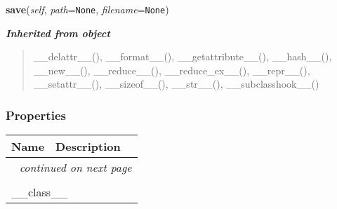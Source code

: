 \hspace{.8\funcindent}\begin{boxedminipage}{\funcwidth}

    \raggedright \textbf{save}(\textit{self}, \textit{path}={\tt None}, \textit{filename}={\tt None})

\setlength{\parskip}{2ex}
\setlength{\parskip}{1ex}
    \end{boxedminipage}


\large{\textbf{\textit{Inherited from object}}}

\begin{quote}
\_\_delattr\_\_(), \_\_format\_\_(), \_\_getattribute\_\_(), \_\_hash\_\_(), \_\_new\_\_(), \_\_reduce\_\_(), \_\_reduce\_ex\_\_(), \_\_repr\_\_(), \_\_setattr\_\_(), \_\_sizeof\_\_(), \_\_str\_\_(), \_\_subclasshook\_\_()
\end{quote}


  \subsubsection{Properties}

    \vspace{-1cm}
\hspace{\varindent}\begin{longtable}{|p{\varnamewidth}|p{\vardescrwidth}|l}
\cline{1-2}
\cline{1-2} \centering \textbf{Name} & \centering \textbf{Description}& \\
\cline{1-2}
\endhead\cline{1-2}\multicolumn{3}{r}{\small\textit{continued on next page}}\\\endfoot\cline{1-2}
\endlastfoot\multicolumn{2}{|l|}{\textit{Inherited from object}}\\
\multicolumn{2}{|p{\varwidth}|}{\raggedright \_\_class\_\_}\\
\cline{1-2}
\end{longtable}



